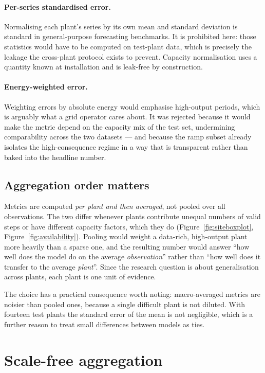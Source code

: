 \paragraph{Per-series standardised error.} Normalising each plant's series by its own mean and
standard deviation is standard in general-purpose forecasting benchmarks. It is prohibited
here: those statistics would have to be computed on test-plant data, which is precisely the
leakage the cross-plant protocol exists to prevent. Capacity normalisation uses a quantity
known at installation and is leak-free by construction.

\paragraph{Energy-weighted error.} Weighting errors by absolute energy would emphasise
high-output periods, which is arguably what a grid operator cares about. It was rejected
because it would make the metric depend on the capacity mix of the test set, undermining
comparability across the two datasets --- and because the ramp subset already isolates the
high-consequence regime in a way that is transparent rather than baked into the headline
number.

\subsection{Aggregation order matters}

Metrics are computed \emph{per plant and then averaged}, not pooled over all observations.
The two differ whenever plants contribute unequal numbers of valid steps or have different
capacity factors, which they do (Figure~\ref{fig:siteboxplot}, Figure~\ref{fig:availability}).
Pooling would weight a data-rich, high-output plant more heavily than a sparse one, and the
resulting number would answer ``how well does the model do on the average \emph{observation}''
rather than ``how well does it transfer to the average \emph{plant}''. Since the research
question is about generalisation across plants, each plant is one unit of evidence.

The choice has a practical consequence worth noting: macro-averaged metrics are noisier than
pooled ones, because a single difficult plant is not diluted. With fourteen test plants the
standard error of the mean is not negligible, which is a further reason to treat small
differences between models as ties.

\section{Scale-free aggregation}
\label{sec:aggregation}

